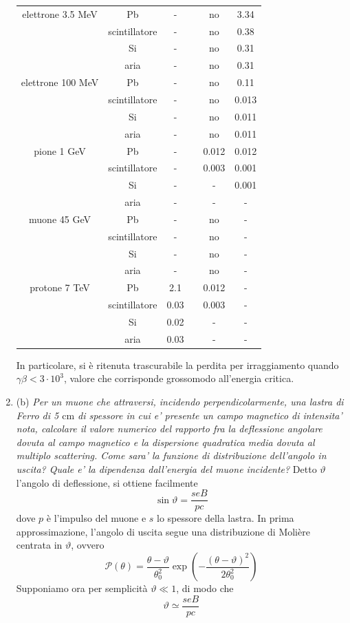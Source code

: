 \documentclass{article}
\renewcommand{\b}{(b)}
\renewcommand{\t}[1]{\textit{ #1}}
\begin{document}
\begin{enumerate}
\begin{center}
\begin{tabular}{c | c | c c c c}
		elettrone 3.5 MeV&Pb&-&&no&3.34\\
		&scintillatore&-&&no&0.38\\
		&Si&-&&no&0.31\\
		&aria&-&&no&0.31\\\hline
		elettrone 100 MeV&Pb&-&&no&0.11\\
		&scintillatore&-&&no&0.013\\
		&Si&-&&no&0.011\\
		&aria&-&&no&0.011\\\hline
		pione 1 GeV&Pb&-&&0.012&0.012\\
		&scintillatore&-&&0.003&0.001\\
		&Si&-&&-&0.001\\
		&aria&-&&-&-\\\hline
		muone 45 GeV&Pb&-&&no&-\\
		&scintillatore&-&&no&-\\
		&Si&-&&no&-\\
		&aria&-&&no&-\\\hline
		protone 7 TeV&Pb&2.1&&0.012&-\\
		&scintillatore&0.03&&0.003&-\\
		&Si&0.02&&-&-\\
		&aria&0.03&&-&-\\
	\end{tabular}
	\end{center}
	In particolare, si è ritenuta trascurabile la perdita per irraggiamento quando $\gamma\beta<3\cdot10^3$, valore che corrisponde grossomodo all'energia critica.
	\item\b\t{Per un muone che attraversi, incidendo perpendicolarmente, una lastra di Ferro di
		5 $\mathrm{cm}$ di spessore in cui e' presente un campo magnetico di intensita' nota, calcolare
		il valore numerico del rapporto fra la deflessione angolare dovuta al campo
		magnetico e la dispersione quadratica media dovuta al multiplo scattering. Come
		sara’ la funzione di distribuzione dell’angolo in uscita? Quale e’ la dipendenza
		dall’energia del muone incidente?}
		Detto $\vartheta$ l'angolo di deflessione, si ottiene facilmente
		\[\sin\vartheta=\frac{seB}{pc}\]
		dove $p$ è l'impulso del muone e $s$ lo spessore della lastra.
		In prima approssimazione, l'angolo di uscita segue una distribuzione di Molière centrata in $\vartheta$, ovvero
		\[\mathcal{P}(\theta)=\frac{\theta-\vartheta}{\theta_0^2}\exp\left(-\frac{(\theta-\vartheta)^2}{2\theta_0^2}\right)\] 
		Supponiamo ora per semplicità $\vartheta\ll1$, di modo che
		\[\vartheta\simeq\frac{seB}{pc}\]

\end{enumerate}
\end{document}
